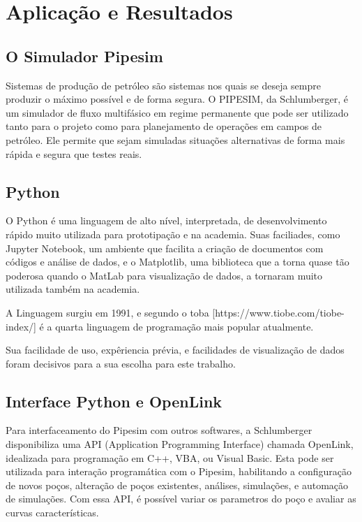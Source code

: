 
\chapter{Aplicação e Resultados} \label{chap:4}


\section{O Simulador Pipesim}
Sistemas de produção de petróleo são sistemas nos quais se deseja sempre produzir o máximo possível e de forma segura.
O PIPESIM, da Schlumberger, é um simulador de fluxo multifásico em regime permanente que pode ser utilizado tanto para o projeto como para planejamento de operações em campos de petróleo. Ele permite que sejam simuladas situações alternativas de forma mais rápida e segura que testes reais.

\section{Python}

O Python é uma linguagem de alto nível, interpretada, de desenvolvimento rápido muito utilizada para prototipação e na academia. Suas faciliades, como Jupyter Notebook, um ambiente que facilita a criação de documentos com códigos e análise de dados, e o Matplotlib, uma biblioteca que a torna quase tão poderosa quando o MatLab para visualização de dados, a tornaram muito utilizada também na academia.

A Linguagem surgiu em 1991, e segundo o toba [https://www.tiobe.com/tiobe-index/] é a quarta linguagem de programação mais popular atualmente.

Sua facilidade de uso, expêriencia prévia, e facilidades de visualização de dados foram decisivos para a sua escolha para este trabalho. 

\section{Interface Python e OpenLink}
Para interfaceamento do Pipesim com outros softwares, a Schlumberger disponibiliza uma API (Application Programming Interface) chamada OpenLink, idealizada para programação em C++, VBA, ou Visual Basic. Esta pode ser utilizada para interação programática com o Pipesim, habilitando a configuração de novos poços, alteração de poços existentes, análises, simulações, e automação de simulações. Com essa API, é possível variar os parametros do poço e avaliar as curvas características.

